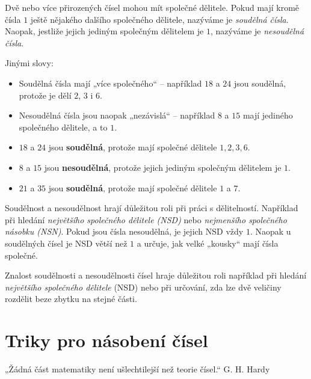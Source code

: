 \documentclass[12pt,a4paper]{article}
\begin{document}
Dvě nebo více přirozených čísel mohou mít společné dělitele.  
Pokud mají kromě čísla $1$ ještě nějakého dalšího společného dělitele, nazýváme je \emph{soudělná čísla}.  
Naopak, jestliže jejich jediným společným dělitelem je $1$, nazýváme je \emph{nesoudělná čísla}.  

Jinými slovy:  
\begin{itemize}
    \item Soudělná čísla mají „více společného“ – například $18$ a $24$ jsou soudělná, protože je dělí $2$, $3$ i $6$.  
    \item Nesoudělná čísla jsou naopak „nezávislá“ – například $8$ a $15$ mají jediného společného dělitele, a to $1$.  
\end{itemize}

\begin{examplebox}
\begin{itemize}
    \item $18$ a $24$ jsou \textbf{soudělná}, protože mají společné dělitele $1,2,3,6$.  
    \item $8$ a $15$ jsou \textbf{nesoudělná}, protože jejich jediným společným dělitelem je $1$.  
    \item $21$ a $35$ jsou \textbf{soudělná}, protože mají společné dělitele $1$ a $7$.  
\end{itemize}
\end{examplebox}

\begin{notebox}
Soudělnost a nesoudělnost hrají důležitou roli při práci s dělitelností.  
Například při hledání \emph{největšího společného dělitele (NSD)} nebo \emph{nejmenšího společného násobku (NSN)}.  
Pokud jsou čísla nesoudělná, je jejich NSD vždy $1$.  
Naopak u soudělných čísel je NSD větší než $1$ a určuje, jak velké „kousky“ mají čísla společné.  
\end{notebox}

\noindent
Znalost soudělnosti a nesoudělnosti čísel hraje důležitou roli například při hledání \emph{největšího společného dělitele} (NSD) nebo při určování, zda lze dvě veličiny rozdělit beze zbytku na stejné části.

\newpage
\section{Triky pro násobení čísel}

\begin{quotebox}
{„Žádná část matematiky není ušlechtilejší než teorie čísel.“}
{G. H. Hardy}
\end{quotebox}
\end{document}
